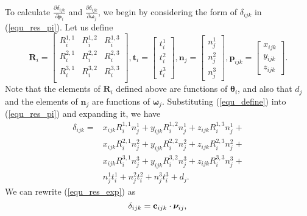 \documentclass{vgtc}                          %
\begin{document}
To calculate 	$\frac{\partial \delta_{ijk} }{\partial {\bm{\rho}}_{i}}$ and $\frac{\partial \delta_{ijk} }{\partial {\bm{\omega}}_{j}}$, we begin by considering the form of $\delta_{ijk}$ in  (\ref{equ_res_pi}).  Let us define
\begin{equation} \label{equ_define}
	\mathbf{R}_{i} = \begin{bmatrix}
	R_i^{1,1} & R_i^{1,2} & R_i^{1,3} \\ 
	R_i^{2,1} & R_i^{2,2} & R_i^{2,3} \\ 
	R_i^{3,1} & R_i^{3,2} & R_i^{3,3} \\ 
	\end{bmatrix},
	\mathbf{t}_{i} = \begin{bmatrix}
		t_{i}^{1} \\
		t_{i}^{2} \\
		t_{i}^{3} 
	\end{bmatrix},
	\mathbf{n}_{j} = \begin{bmatrix}
		n_{j}^{1} \\
		n_{j}^{2} \\
		n_{j}^{3} 
	\end{bmatrix},
	\mathbf{p}_{ijk} = \begin{bmatrix}
		x_{ijk} \\
		y_{ijk} \\
		z_{ijk} 
	\end{bmatrix}.
\end{equation}
Note that the elements of $\mathbf{R}_i$  defined above are functions of $\bm{\theta}_i$, and also that $d_j$ and the elements of $\mathbf{n}_j$ are functions of $\bm{\omega}_j$. Substituting (\ref{equ_define}) into (\ref{equ_res_pi}) and expanding it, we have
\begin{equation}
	\begin{split} \label{equ_res_exp}
		\delta_{ijk} =  & x_{ijk}R_{i}^{1,1}n_j^1 +  y_{ijk}R_{i}^{1,2}n_j^1 + z_{ijk}R_{i}^{1,3}n_j^1   + \\
							   & x_{ijk}R_{i}^{2,1}n_j^2 + y_{ijk}R_{i}^{2,2}n_j^2 + z_{ijk}R_{i}^{2,3}n_j^2  + \\
							   & x_{ijk}R_{i}^{3,1}n_j^3 + y_{ijk}R_{i}^{3,2}n_j^3 + z_{ijk}R_{i}^{3,3}n_j^3   + \\
							   & n_{j}^{1}t_{i}^{1} + n_{j}^{2}t_{i}^{2} + n_{j}^{3}t_{i}^{3} + d_j.
	\end{split}
\end{equation}
We can rewrite (\ref{equ_res_exp}) as
\begin{equation} \label{equ_delta_exp}
\delta_{ijk}   =  \mathbf{c}_{ijk} \cdot \bm{\nu}_{ij}, \\
\end{equation}
\end{document}
